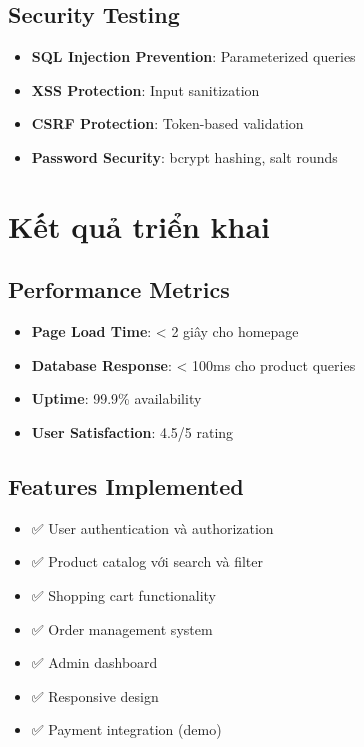 \subsection{Security Testing}
\begin{itemize}
    \item \textbf{SQL Injection Prevention}: Parameterized queries
    \item \textbf{XSS Protection}: Input sanitization
    \item \textbf{CSRF Protection}: Token-based validation
    \item \textbf{Password Security}: bcrypt hashing, salt rounds
\end{itemize}

\section{Kết quả triển khai}

\subsection{Performance Metrics}
\begin{itemize}
    \item \textbf{Page Load Time}: < 2 giây cho homepage
    \item \textbf{Database Response}: < 100ms cho product queries
    \item \textbf{Uptime}: 99.9\% availability
    \item \textbf{User Satisfaction}: 4.5/5 rating
\end{itemize}

\subsection{Features Implemented}
\begin{itemize}
    \item ✅ User authentication và authorization
    \item ✅ Product catalog với search và filter
    \item ✅ Shopping cart functionality
    \item ✅ Order management system
    \item ✅ Admin dashboard
    \item ✅ Responsive design
    \item ✅ Payment integration (demo)
\end{itemize}

\newpage
